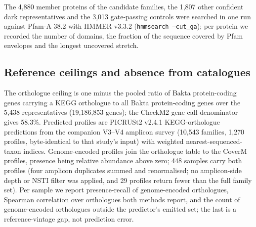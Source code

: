 \documentclass[11pt]{article}
\begin{document}
The 4{,}880 member proteins of
the candidate families, the 1{,}807 other confident dark representatives and the 3{,}013 gate-passing
controls were searched in one run against Pfam-A 38.2 with HMMER v3.3.2 (\texttt{hmmsearch --cut\_ga});
per protein we recorded the number of domains, the fraction of the sequence covered by Pfam
envelopes and the longest uncovered stretch.

\subsection*{Reference ceilings and absence from catalogues}
The orthologue ceiling is one minus the pooled ratio of Bakta protein-coding genes carrying a KEGG
orthologue to all Bakta protein-coding genes over the 5{,}438 representatives (19{,}186{,}853 genes);
the CheckM2 gene-call denominator gives 58.3\%. Predicted profiles are PICRUSt2 v2.4.1
\citep{douglas2020picrust2} KEGG-orthologue predictions from the companion V3--V4 amplicon survey
(10{,}543 families, 1{,}270 profiles, byte-identical to that study's input) with weighted
nearest-sequenced-taxon indices. Genome-encoded profiles join the orthologue table to the CoverM
profiles, presence being relative abundance above zero; 448 samples carry both profiles (four
amplicon duplicates summed and renormalised; no amplicon-side depth or NSTI filter was applied, and
29 profiles return fewer than the full family set). Per sample we report presence-recall of
genome-encoded orthologues, Spearman correlation over orthologues both methods report, and the count
of genome-encoded orthologues outside the predictor's emitted set; the last is a reference-vintage
gap, not prediction error.
\end{document}
